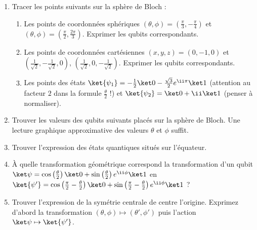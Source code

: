 \documentclass[11pt,class=report,crop=false]{standalone}
\renewcommand{\commentfigure}[1]{#1} %
\begin{document}
\begin{exercicecours}
\sauteligne
\begin{enumerate}
  \item Tracer les points suivants sur la sphère de Bloch :
  \begin{enumerate}
    \item Les points de coordonnées sphériques $(\theta,\phi)=(\frac\pi3,-\frac\pi4)$ et $(\theta,\phi)=(\frac\pi2,\frac{2\pi}{3})$.
    Exprimer les qubits correspondants. 
    
    \item Les points de coordonnées cartésiennes $(x,y,z) = (0,-1,0)$
    et $(\frac{1}{\sqrt2},-\frac{1}{\sqrt2},0)$, $(\frac{1}{\sqrt2},0,-\frac1{\sqrt2})$. Exprimer les qubits correspondants. 
    
    \item Les points des états $\ket{\psi_1} = -\frac12\ket0 - \frac{\sqrt3}{2}e^{\ii\pi}\ket1$ (attention au facteur $2$ dans la formule $\frac\theta2$ !) et    
    $\ket{\psi_2} = \ket0 + \ii\ket1$ (penser à normaliser).
    
  \end{enumerate}
  
  \item Trouver les valeurs des qubits suivants placés sur la sphère de Bloch.
  Une lecture graphique approximative des valeurs $\theta$ et $\phi$ suffit.
  
  \commentfigure{
  \myfigure{0.8}{
  \tikzinput{bloch05a}\qquad\qquad
  \tikzinput{bloch05b}
  } 
  }

  \item Trouver l'expression des états quantiques situés sur l'équateur.
  
  
  \item À quelle transformation géométrique correspond la transformation d'un qubit $\ket\psi = \cos\left(\frac\theta2\right)\ket0+ \sin\left(\frac\theta2\right)e^{\ii\phi}\ket1$
  en $\ket{\psi'} = \cos\left(\frac\pi2-\frac\theta2\right)\ket0+ \sin\left(\frac\pi2-\frac\theta2\right)e^{\ii\phi}\ket1$ ?
  
  \item Trouver l'expression de la symétrie centrale de centre l'origine.
  Exprimez d'abord la transformation $(\theta,\phi) \mapsto (\theta',\phi')$
  puis l'action $\ket\psi \mapsto \ket{\psi'}$.
  
\end{enumerate}
\end{exercicecours}
\end{document}
